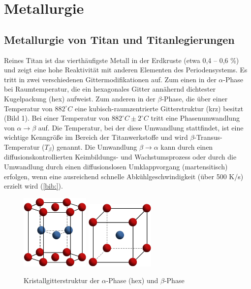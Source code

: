 \chapter{Metallurgie}	


\section{Metallurgie von Titan und Titanlegierungen}
Reines Titan ist das vierthäufigste Metall in der Erdkruste (etwa 0,4 -- 0,6 \%) und zeigt eine hohe Reaktivität mit anderen Elementen des Periodensystems. Es tritt in zwei verschiedenen Gittermodifikationen auf. Zum einen in der $\alpha$-Phase bei Raumtemperatur, die ein hexagonales Gitter annähernd dichtester Kugelpackung (hex) aufweist. Zum anderen in der $\beta$-Phase, die über einer Temperatur von $882 ^\circ C$ eine kubisch-raumzentrierte Gitterstruktur (krz) besitzt (Bild 1). Bei einer Temperatur von $882^\circ C \pm 2 ^\circ C$ tritt eine Phasenumwandlung von $\alpha \rightarrow \beta$ auf. Die Temperatur, bei der diese Umwandlung stattfindet, ist eine wichtige Kenngröße im Bereich der Titanwerkstoffe und wird $\beta$-Transus-Temperatur ($T_{\beta}$) genannt.
Die Umwandlung $\beta \rightarrow \alpha$ kann durch einen diffusionskontrollierten Keimbildungs- und Wachstumsprozess oder durch die Umwandlung durch einen diffusionslosen Umklappvorgang (martensitisch) erfolgen, wenn eine ausreichend schnelle Abkühlgeschwindigkeit (über 500 K/s) erzielt wird (\ref{bib:}).

\begin{figure}[h]
	\centering
	\subfloat{}
	\includegraphics[width=0.3\textwidth]{Bilder/hcp}
	\hspace{4ex}
	\subfloat{}
	\includegraphics[width=0.3\textwidth]{Bilder/krz}
	\caption{Kristallgitterstruktur der $\alpha$-Phase (hex) und $\beta$-Phase}
	\label{fig:Kristallgitter}
\end{figure}


